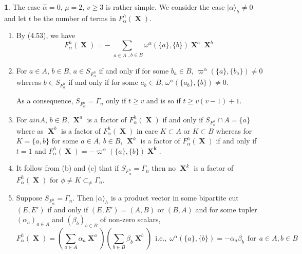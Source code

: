 \documentclass[a4paper,12pt]{article}
\DeclareMathOperator{\x}{\mathrm{X}}
\theoremstyle{definition}
\theoremstyle{underlinethm}
\theoremstyle{definition}
\newtheorem{subsubsec}{}[subsection]
\begin{document}
\begin{subsubsec}\label{subsubsection-4.4.3}
The case $\hat{\alpha} = 0$, $\mu = 2$, $v \geq 3$ is rather simple. We consider the case $| \alpha \rangle_{h} \neq 0$ and let $t$ be the number of terms in $F_{\alpha}^{h}(\boldsymbol{\x})$.
\end{subsubsec}
\begin{enumerate}[label=(\alph*)]
\item By (4.53), we have 
\begin{equation}
F_{\alpha}^{h}(\boldsymbol{\x}) = - \sum_{\substack{a \in A}, b \in B} \omega^{\alpha} (\{a\}, \{b\}) \boldsymbol{\x}^{a} \boldsymbol{\x}^{b}\tag{4.56}\label{eq-4.56}
\end{equation}

\item For $a \in A$, $b \in B$, $a \in S_{F_{\alpha}^{h}}$ if and only if for some $b_{a} \in B$, $\varpi^{\alpha}(\{a\}, \{b_{a}\})\neq 0$ whereas $b \in S_{F_{\alpha}^{h}}$ if and only if for some $a_{b} \in B$, $\omega^{\alpha}(\{a_{b}\}, \{b\}) \neq 0$.

As a consequence, $S_{F_{\alpha}^{h}} = \Gamma_{n}$ only if $t \geq v$ and is so if $t \geq v(v-1) + 1$.

\item For $a in A$, $b \in B$, $\boldsymbol{\x}^{a}$ is a factor of $F_{\alpha}^{h}(\boldsymbol{\x})$ if and only if $S_{F_{\alpha}^{h}} \cap A = \{a\}$ where as $\boldsymbol{\x}^{b}$ is a factor of $F_{\alpha}^{h}(\boldsymbol{\x})$ in care $K \subset A$ or $K \subset B$ whereas for $K =\{a, b\}$ for some $a \in A$, $b \in B$, $\boldsymbol{\x}^{k}$ is a factor of $F_{\alpha}^{h}(\boldsymbol{\x})$ if and only if $t=1$ and $F_{\alpha}^{h}(\boldsymbol{\x}) = -\varpi^{\alpha} (\{a\}, \{b\}) \boldsymbol{\x^{k}}$.

\item It follow from (b) and (c) that if $S_{F_{\alpha}^{h}} = \Gamma_{n}$ then no $\boldsymbol{\x}^{k}$ is a factor of $F_{\alpha}^{h}(\boldsymbol{\x})$ for $\phi \neq K \subset_{\neq } \Gamma_{n}$.

\item Suppose $S_{F_{\alpha}^{h}} = \Gamma_{n}$. Then $| \alpha \rangle_{h}$ is a product vector in some bipartite cut $(E, E')$ if and only if $(E, E') = (A, B)$ or $(B, A)$ and for  some tupler $(\alpha_{a})_{a \in A} $ and $(\beta_{b})_{b \in B}$ of non-zero scalars, 
\begin{equation}
F_{\alpha}^{h}(\boldsymbol{\x}) = \left(\sum_{a \in A} \alpha_{a} \boldsymbol{\x}^{a} \right) \left(\sum_{b \in B} \beta_{b} \boldsymbol{\x}^{b}\right)~~\text{i.e.,}~~ \omega^{\alpha} (\{a\}, \{b\}) = -\alpha_{a}\beta_{b}~~\text{for}~~a\in A , b \in B\tag{4.57}\label{eq-4.57}
\end{equation}


\end{enumerate}
\end{document}
